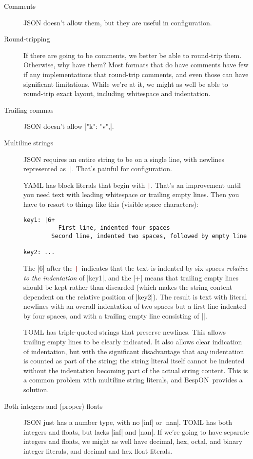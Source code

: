 \documentclass[11pt]{article}
\newcommand{\bespon}{BespON}
\newcommand{\verbpipe}{\textcolor{DarkRed}{\texttt{\string|}}}
\begin{document}
\begin{description}
\item[Comments]  JSON doesn't allow them, but they are useful in configuration.

\item[Round-tripping]  If there are going to be comments, we better be able to round-trip them.  Otherwise, why have them?  Most formats that do have comments have few if any implementations that round-trip comments, and even those can have significant limitations.  While we're at it, we might as well be able to round-trip exact layout, including whitespace and indentation.

\item[Trailing commas]  JSON doesn't allow |{"k": "v",}|.

\item[Multiline strings]  JSON requires an entire string to be on a single line, with newlines represented as |\n|.  That's painful for configuration.

YAML has block literals that begin with \verbpipe.  That's an improvement until you need text with leading whitespace or trailing empty lines.  Then you have to resort to things like this (visible space characters):
\begin{Verbatim}[showspaces]
key1: |6+
          First line, indented four spaces
        Second line, indented two spaces, followed by empty line

key2: ...
\end{Verbatim}
The |6| after the \verbpipe\ indicates that the text is indented by six spaces \emph{relative to the indentation} of |key1|, and the |+| means that trailing empty lines should be kept rather than discarded (which makes the string content dependent on the relative position of |key2|).  The result is text with literal newlines with an overall indentation of two spaces but a first line indented by four spaces, and with a trailing empty line consisting of |\n|.

TOML has triple-quoted strings that preserve newlines.  This allows trailing empty lines to be clearly indicated.  It also allows clear indication of indentation, but with the significant disadvantage that \emph{any} indentation is counted as part of the string; the string literal itself cannot be indented without the indentation becoming part of the actual string content.  This is a common problem with multiline string literals, and \bespon\ provides a solution.

\item[Both integers and (proper) floats]  JSON just has a number type, with no |inf| or |nan|.  TOML has both integers and floats, but lacks |inf| and |nan|.  If we're going to have separate integers and floats, we might as well have decimal, hex, octal, and binary integer literals, and decimal and hex float literals.


\end{description}
\end{document}
